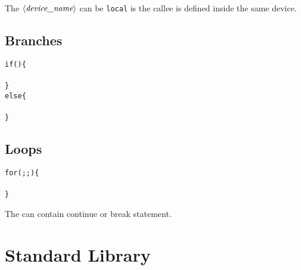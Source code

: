 \documentclass{note}\usepackage{mathptm,mydef}
\begin{document}
The $\mbox{$\langle{\textit{device\_name}}\rangle$}$ can be \verb+local+ is the callee is defined inside
the same device.



\subsection{Branches}
\begin{alltt}
  \textcolor{red2}{if (\textrm{}) \{
    \textrm{}
  \}
  else \{
    \textrm{}
  \}}
\end{alltt}

\subsection{Loops}
\begin{alltt}
  \textcolor{red2}{for (\textrm{}; \textrm{}; \textrm{}) \{
    \textrm{}
  \}}
\end{alltt}
The \textrm{} can contain \textcolor{red2}{\texttt{}continue}
or \textcolor{red2}{\texttt{}break} statement.


\section{Standard Library}

\end{document}
